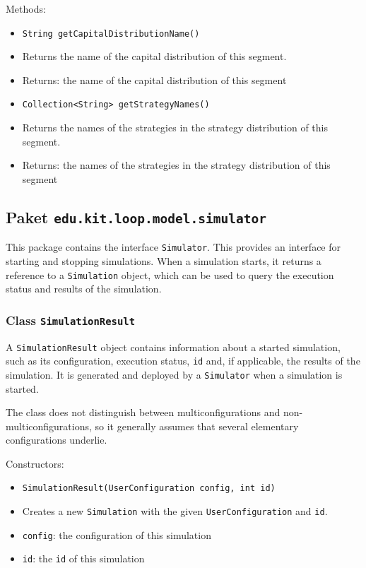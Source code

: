 \documentclass[parskip=full,11pt]{scrartcl}
\begin{document}
Methods:
\begin{itemize}\itemsep -10pt
\item \texttt{String getCapitalDistributionName()}
\item[] Returns the name of the capital distribution of this segment.
\item[] Returns: the name of the capital distribution of this segment

\item \texttt{Collection<String> getStrategyNames()}
\item[] Returns the names of the strategies in the strategy distribution of this segment.
\item[] Returns: the names of the strategies in the strategy distribution of this segment
\end{itemize}


\subsection{Paket \texttt{edu.kit.loop.model.simulator}}
This package contains the interface \texttt{Simulator}. This provides an interface for starting and stopping simulations. When a simulation starts, it returns a reference to a \texttt{Simulation} object, which can be used to query the execution status and results of the simulation.

\subsubsection{Class \texttt{SimulationResult}}
A \texttt{SimulationResult} object contains information about a started simulation, such as its configuration, execution status, \texttt{id} and, if applicable, the results of the simulation. It is generated and deployed by a \texttt{Simulator} when a simulation is started.

The class does not distinguish between multiconfigurations and non-multiconfigurations, so it generally assumes that several elementary configurations underlie.

Constructors:
\begin{itemize} \itemsep -10pt
	\item \texttt{SimulationResult(UserConfiguration config, int id)}
	\item[] Creates a new \texttt{Simulation} with the given \texttt{UserConfiguration} and \texttt{id}.
	\item[] \texttt{config}: the configuration of this simulation
	\item[] \texttt{id}: the \texttt{id} of this simulation
\end{itemize}
\end{document}
